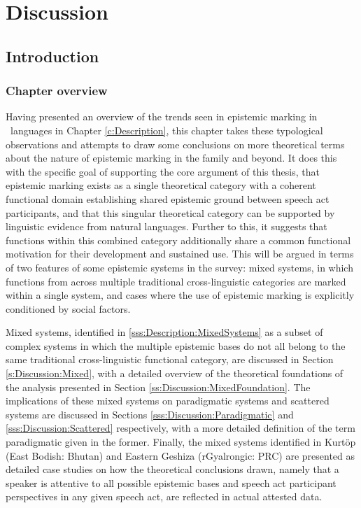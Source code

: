 \chapter{Discussion}\label{c:Discussion}
\section{Introduction}\label{s:Discussion:Introduction}
\subsection{Chapter overview}
Having presented an overview of the trends seen in epistemic marking in \lfam\ languages in Chapter \ref{c:Description}, this chapter takes these typological observations and attempts to draw some conclusions on more theoretical terms about the nature of epistemic marking in the family and beyond. It does this with the specific goal of supporting the core argument of this thesis, that epistemic marking exists as a single theoretical category with a coherent functional domain establishing shared epistemic ground between speech act participants, and that this singular theoretical category can be supported by linguistic evidence from natural languages. Further to this, it suggests that functions within this combined category additionally share a common functional motivation for their development and sustained use. This will be argued in terms of two features of some epistemic systems in the survey: mixed systems, in which functions from across multiple traditional cross-linguistic categories are marked within a single system, and cases where the use of epistemic marking is explicitly conditioned by social factors.

Mixed systems, identified in \ref{sss:Description:MixedSystems} as a subset of complex systems in which the multiple epistemic bases do not all belong to the same traditional cross-linguistic functional category, are discussed in Section \ref{s:Discussion:Mixed}, with a detailed overview of the theoretical foundations of the analysis presented in Section \ref{ss:Discussion:MixedFoundation}. The implications of these mixed systems on paradigmatic systems and scattered systems are discussed in Sections \ref{sss:Discussion:Paradigmatic} and \ref{sss:Discussion:Scattered} respectively, with a more detailed definition of the term paradigmatic given in the former. Finally, the mixed systems identified in Kurtöp (East Bodish: Bhutan) and Eastern Geshiza (rGyalrongic: PRC) are presented as detailed case studies on how the theoretical conclusions drawn, namely that a speaker is attentive to all possible epistemic bases and speech act participant perspectives in any given speech act, are reflected in actual attested data.

